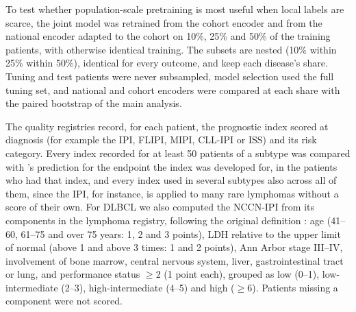 To test whether population-scale pretraining is most useful when local labels
are scarce, the joint model was retrained from the cohort encoder and from the
national encoder adapted to the cohort on 10\%, 25\% and 50\% of the training
patients, with otherwise identical training. The subsets are nested (10\% within
25\% within 50\%), identical for every outcome, and keep each disease's share.
Tuning and test patients were never subsampled, model selection used the full
tuning set, and national and cohort encoders were compared at each share with
the paired bootstrap of the main analysis.

The quality registries record, for each patient, the prognostic index scored at
diagnosis (for example the IPI, FLIPI, MIPI, CLL-IPI or ISS)
\citep{IPI1993,solalceligny2004flipi,hoster2008mipi,cllipi2016,greipp2005iss}
and its risk category. Every index recorded for at least 50 patients of a
subtype was compared with \opera{}'s prediction for the endpoint the
index was developed for, in the patients who had that index, and every index
used in several subtypes also across all of them, since the IPI, for instance,
is applied to many rare lymphomas without a score of their own. For DLBCL we
also computed the NCCN-IPI from its components in the lymphoma registry,
following the original definition \citep{zhou2014nccnipi}: age (41--60, 61--75
and over 75 years: 1, 2 and 3 points), LDH relative to the upper limit of
normal (above 1 and above 3 times: 1 and 2 points), Ann Arbor stage III--IV,
involvement of bone marrow, central nervous system, liver, gastrointestinal
tract or lung, and performance status $\geq$2 (1 point each), grouped as low
(0--1), low-intermediate (2--3), high-intermediate (4--5) and high ($\geq$6).
Patients missing a component were not scored.

